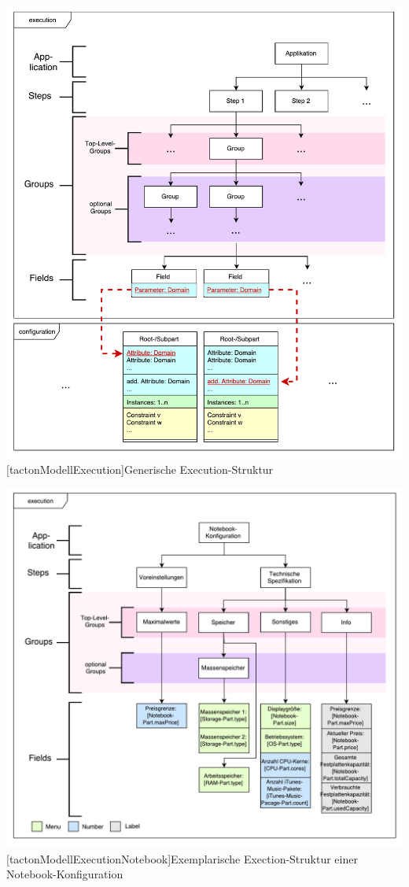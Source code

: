 \documentclass[11pt, a4paper, titlepage, listof=totoc, bibliography=totoc, index=totoc, twoside, openright, headings=normal]{scrreprt}
\begin{document}
\vspace{1em}
\begin{minipage}{\linewidth}
	\centering
	\includegraphics[width=1\linewidth]{Abbildungen/tactonModellExecution.pdf}
	[tactonModellExecution]{Generische Execution-Struktur}
	\label{fig:tactonModellExecution}
\end{minipage}
\begin{minipage}{\linewidth}
	\centering
	\includegraphics[width=0.8\linewidth]{Abbildungen/tactonModellExecutionNotebook.pdf}
	[tactonModellExecutionNotebook]{Exemplarische Exection-Struktur einer Notebook-Konfiguration}
	\label{fig:tactonModellExecutionNotebook}
\end{minipage}
\vspace{1em}
\end{document}
